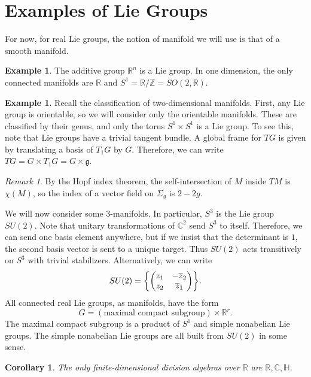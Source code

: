 \documentclass[leqno, openany]{memoir}
\newtheorem{cor}[thm]{Corollary}
\theoremstyle{definition}
\newtheorem{exm}[thm]{Example}
\theoremstyle{remark}
\newtheorem{rmk}[thm]{Remark}
\theoremstyle{plain}
\theoremstyle{definition}
\theoremstyle{remark}
\newcommand{\R}{\mathbb{R}}
\newcommand{\C}{\mathbb{C}}
\newcommand{\Z}{\mathbb{Z}}
\newcommand{\mf}[1]{\mathfrak{#1}}
\newcommand{\ol}[1]{\overline{#1}}
\begin{document}
\section{Examples of Lie Groups}%
\label{sec:examples_of_lie_groups}

For now, for real Lie groups, the notion of manifold we will use is that of a smooth manifold.

\begin{exm}
    The additive group $\R^n$ is a Lie group. In one dimension, the only connected manifolds are $\R$ and $S^1 = \R / \Z = SO(2,\R)$. 
\end{exm}

\begin{exm}
    Recall the classification of two-dimensional manifolds. First, any Lie group is orientable, so we will consider only the orientable manifolds. These are classified by their genus, and only the torus $S^1 \times S^1$ is a Lie group. To see this, note that Lie groups have a trivial tangent bundle. A global frame for $TG$ is given by translating a basis of $T_1 G$ by $G$. Therefore, we can write $TG = G \times T_1 G = G \times \mf{g}$.
\end{exm}

\begin{rmk}
    By the Hopf index theorem, the self-intersection of $M$ inside $TM$ is $\chi (M)$, so the index of a vector field on $\Sigma_g$ is $2 - 2g$.
\end{rmk}

We will now consider some $3$-manifolds. In particular, $S^3$ is the Lie group $SU(2)$. Note that unitary transformations of $\C^2$ send $S^3$ to itself. Therefore, we can send one basis element anywhere, but if we insist that the determinant is $1$, the second basis vector is sent to a unique target. Thus $SU(2)$ acts transitively on $S^3$ with trivial stabilizers. Alternatively, we can write
\[ SU(2) = \qty{ \begin{pmatrix}
        z_1 & -\ol{z}_2 \\
        z_2 & \ol{z}_1
\end{pmatrix} }. \]
All connected real Lie groups, as manifolds, have the form
\[ G = (\text{maximal compact subgroup}) \times \R^r. \]
The maximal compact subgroup is a product of $S^1$ and simple nonabelian Lie groups. The simple nonabelian Lie groups are all built from $SU(2)$ in some sense.

\begin{cor}
    The only finite-dimensional division algebras over $\R$ are $\R, \C, \mathbb{H}$.
\end{cor}
\end{document}
